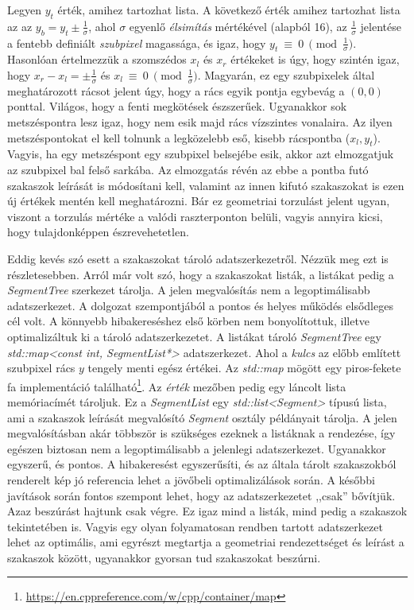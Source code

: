 \documentclass[12pt]{report}
\theoremstyle{definition}
\newcommand{\func}[1]{{\textsl{#1}}}
\begin{document}
Legyen $y_t$ érték, amihez tartozhat lista. A következő érték amihez tartozhat
lista az az $y_b = y_t \pm \frac{1}{\sigma}$, ahol $\sigma$ egyenlő
\emph{élsimítás} mértékével (alapból 16), az $\frac{1}{\sigma}$ jelentése a
fentebb definiált \emph{szubpixel} magassága, és igaz, hogy
$y_t~\equiv~0~\pmod{\frac{1}{\sigma}}$. Hasonlóan értelmezzük a szomszédos
$x_l$ és $x_r$ értékeket is úgy, hogy szintén igaz, hogy $x_r - x_l =
\pm\frac{1}{\sigma}$ és $x_l~\equiv~0~\pmod{\frac{1}{\sigma}}$. Magyarán, ez
egy szubpixelek által meghatározott rácsot jelent úgy, hogy a rács egyik pontja
egybevág a $(0, 0)$ ponttal. Világos, hogy a fenti megkötések észszerűek.
Ugyanakkor sok metszéspontra lesz igaz, hogy nem esik majd rács vízszintes
vonalaira. Az ilyen metszéspontokat el kell tolnunk a legközelebb eső, kisebb
rácspontba ($x_l, y_t$). Vagyis, ha egy metszéspont egy szubpixel belsejébe esik,
akkor azt elmozgatjuk az szubpixel bal felső sarkába. Az elmozgatás révén az
ebbe a pontba futó szakaszok leírását is módosítani kell, valamint az innen
kifutó szakaszokat is ezen új értékek mentén kell meghatározni. Bár ez
geometriai torzulást jelent ugyan, viszont a torzulás mértéke a valódi
raszterponton belüli, vagyis annyira kicsi, hogy tulajdonképpen
észrevehetetlen.

Eddig kevés szó esett a szakaszokat tároló adatszerkezetről. Nézzük meg ezt is
részletesebben. Arról már volt szó, hogy a szakaszokat listák, a listákat pedig
a \func{SegmentTree} szerkezet tárolja. A jelen megvalósítás nem a
legoptimálisabb adatszerkezet. A dolgozat szempontjából a pontos és helyes
működés elsődleges cél volt. A könnyebb hibakereséshez első körben nem
bonyolítottuk, illetve optimalizáltuk ki a tároló adatszerkezetet. A listákat
tároló \func{SegmentTree} egy \func{std::map<const int, SegmentList*>}
adatszerkezet. Ahol a \emph{kulcs} az előbb említett szubpixel rács $y$
tengely menti egész értékei. Az \func{std::map} mögött egy piros-fekete fa
implementáció található\footnote{
{\footnotesize\url{https://en.cppreference.com/w/cpp/container/map}}}. Az
\emph{érték} mezőben pedig egy láncolt lista memóriacímét tároljuk. Ez a
\func{SegmentList} egy \func{std::list<Segment>} típusú lista, ami a szakaszok
leírását megvalósító \func{Segment} osztály példányait tárolja. A jelen
megvalósításban akár többször is szükséges ezeknek a listáknak a rendezése, így
egészen biztosan nem a legoptimálisabb a jelenlegi adatszerkezet. Ugyanakkor
egyszerű, és pontos. A hibakeresést egyszerűsíti, és az általa tárolt
szakaszokból renderelt kép jó referencia lehet a jövőbeli optimalizálások
során. A későbbi javítások során fontos szempont lehet, hogy az adatszerkezetet
,,csak'' bővítjük. Azaz beszúrást hajtunk csak végre. Ez igaz mind a listák,
mind pedig a szakaszok tekintetében is. Vagyis egy olyan folyamatosan rendben
tartott adatszerkezet lehet az optimális, ami egyrészt megtartja a geometriai
rendezettséget és leírást a szakaszok között, ugyanakkor gyorsan tud
szakaszokat beszúrni.
\end{document}
